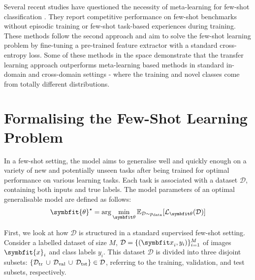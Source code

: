 Several recent studies have questioned the necessity of meta-learning for few-shot classification \parencite{goodemballneed2020, Medina2020Self-SupervisedClassification, dhillon2019baseline, ziko2020laplacian, boudiaf2020information,chen2021self}. They report competitive performance on few-shot benchmarks without episodic training or few-shot task-based experiences during training. These methods follow the second approach and aim to solve the few-shot learning problem by fine-tuning a pre-trained feature extractor with a standard cross-entropy loss.
Some of these methods \parencite{Medina2020Self-SupervisedClassification, goodemballneed2020, das2022confess} in the space demonstrate that the transfer learning approach outperforms meta-learning based methods in standard in-domain and cross-domain settings - where the training and novel classes come from totally different distributions.

\section{Formalising the Few-Shot Learning Problem}\label{sec:formalising-fsl}

In a few-shot setting, the model aims to generalise well and quickly enough on a variety of new and potentially unseen tasks after being trained for optimal performance on various learning tasks.
Each task is associated with a dataset $\mathcal{D}$, containing both inputs and true labels. 
The model parameters of an optimal generalisable model are defined as follows:
\begin{equation}
    \symbfit{\theta}^\star = \arg\min_{\symbfit \theta} \mathbb{E}_{\mathcal{D}\sim \pdata} [\mathcal{L}_{\symbfit \theta}(\mathcal{D})]
\end{equation}

First, we look at how \(\mathcal{D}\) is structured in a standard supervised few-shot setting. 
Consider a labelled dataset of size $M$, $\mathcal{D} = \{({\symbfit x}_i, y_i)\}_{i = 1}^{M}$ of images $\symbfit{x}_i$ and class labels $y_i$. 
This dataset $\mathcal{D}$ is divided into three disjoint subsets: $\left\{\mathcal{D}_\textup{tr}\, \cup\, \mathcal{D}_\textup{val}\, \cup\, \mathcal{D}_\textup{tst}\right\} \in \mathcal{D}$, referring to the training, validation, and test subsets, respectively.

